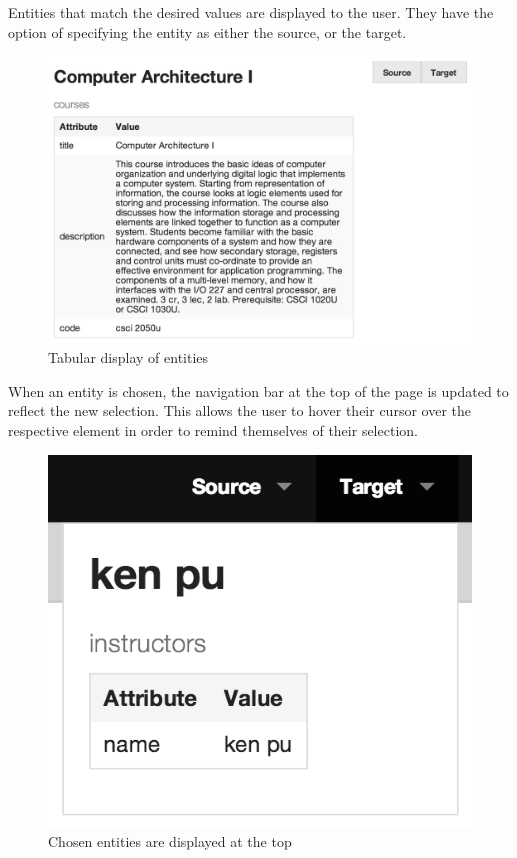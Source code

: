 		Entities that match the desired values are displayed to the user.  They have the option of specifying the entity as either the source, or the target.
		
		\begin{figure}[H]
			\centering
			\includegraphics[scale=0.5]{figures/images/step-2}
			
			\caption{Tabular display of entities}
			\label{fig:webui-step-2}
		\end{figure}
		
		When an entity is chosen, the navigation bar at the top of the page is updated to reflect the new selection.  This allows the user to hover their cursor over the respective element in order to remind themselves of their selection.
		
		\begin{figure}[H]
			\centering
			\includegraphics[scale=0.5]{figures/images/step-3}
			
			\caption{Chosen entities are displayed at the top}
			\label{fig:webui-step-3}
		\end{figure}
		
